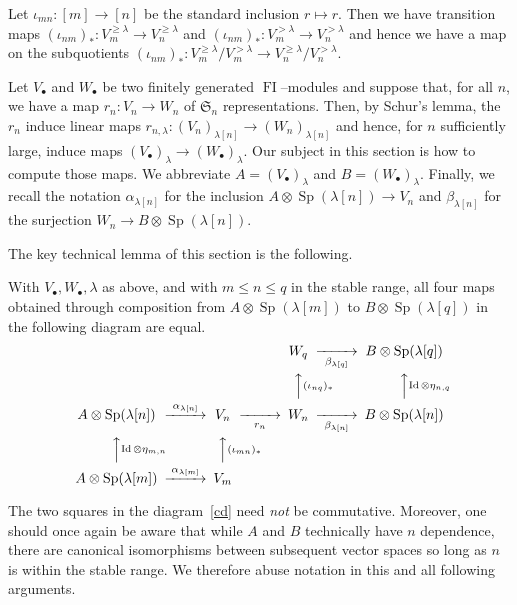 \documentclass[ALCO,ThmDefs,Unicode,epreuves]{cedram}
\DeclareMathOperator{\FI}{FI}
\DeclareMathOperator{\Sp}{Sp}
\DeclareMathOperator{\Id}{Id}
\newcommand{\Sn}{\mathfrak{S}}
\newcommand{\dt}{\bullet}
\begin{document}
Let $\iota_{mn}: [m] \to [n]$ be the standard inclusion $r \mapsto r$. Then we have transition maps $(\iota_{nm})_{\ast}: V^{\geq \lambda}_m \to V^{\geq \lambda}_n$ and $(\iota_{nm})_{\ast}: V^{> \lambda}_m \to V^{> \lambda}_n$ and hence we have a map on the subquotients $(\iota_{nm})_{\ast}: V^{\geq \lambda}_m/V^{>\lambda}_m \to V^{\geq \lambda}_n/V^{>\lambda}_n$.

Let $V_{\bullet}$ and $W_{\bullet}$ be two finitely generated $\FI$--modules and suppose that, for all $n$, we have a map $r_n : V_n \to W_n$ of $\Sn_n$ representations. Then, by Schur's lemma, the $r_n$ induce linear maps $r_{n,\lambda} :(V_n)_{\lambda[n]} \to (W_n)_{\lambda[n]}$ and hence, for $n$ sufficiently large, induce maps $(V_\dt)_{\lambda} \to (W_\dt)_{\lambda}$. Our subject in this section is how to compute those maps. We abbreviate $A = (V_\dt)_{\lambda}$ and $B = (W_\dt)_{\lambda}$. Finally, we recall the notation $\alpha_{\lambda[n]}$ for the inclusion $A \otimes \Sp(\lambda[n]) \to V_n$ and $\beta_{\lambda[n]}$ for the surjection $W_n \to B \otimes \Sp(\lambda[n])$.


The key technical lemma of this section is the following.

\begin{lemma}\label{comdi}
With $V_\bullet,W_\bullet,\lambda$ as above, and with $m \leq n \leq q$ in the stable range, all four maps obtained through composition from $A \otimes \Sp(\lambda[m])$ to $B \otimes \Sp(\lambda[q])$ in the following diagram are equal.
\begin{equation}
\begin{CD}
@. @. W_q @>>\beta_{\lambda[q]}> B \otimes \Sp(\lambda[q])\\
@. @. @AA(\iota_{nq})_\ast A @AA \Id \otimes \eta_{n,q}A\\
A \otimes \Sp(\lambda[n]) @>\alpha_{\lambda[n]}>> V_n @>>r_n> W_n @>>\beta_{\lambda[n]}> B \otimes\Sp(\lambda[n])\\
@AA \Id \otimes \eta_{m,n}A @AA(\iota_{mn})_\ast A\\
A \otimes \Sp(\lambda[m]) @>\alpha_{\lambda[m]}>> V_m @. @.
\end{CD}\label{cd}
\end{equation}
\end{lemma}

\begin{remark}
The two squares in the diagram~\eqref{cd} need \emph{not} be commutative. Moreover, one should once again be aware that while $A$ and $B$ technically have $n$ dependence, there are canonical isomorphisms between subsequent vector spaces so long as $n$ is within the stable range. We therefore abuse notation in this and all following arguments.
\end{remark}
\end{document}
